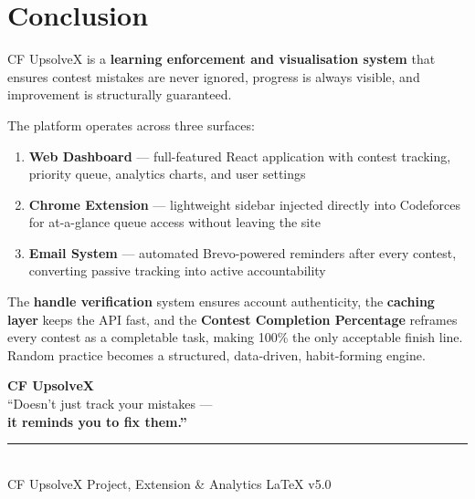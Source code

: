 \documentclass[11pt, a4paper]{article}
\begin{document}
\section{Conclusion}

\begin{infobox}
  CF UpsolveX is a \textbf{learning enforcement and visualisation system}
  that ensures contest mistakes are never ignored, progress is always visible,
  and improvement is structurally guaranteed.

  \vspace{0.5em}
  The platform operates across three surfaces:
  \begin{enumerate}
    \item \textbf{Web Dashboard} --- full-featured React application with contest
          tracking, priority queue, analytics charts, and user settings
    \item \textbf{Chrome Extension} --- lightweight sidebar injected directly
          into Codeforces for at-a-glance queue access without leaving the site
    \item \textbf{Email System} --- automated Brevo-powered reminders after every
          contest, converting passive tracking into active accountability
  \end{enumerate}

  \vspace{0.5em}
  The \textbf{handle verification} system ensures account authenticity,
  the \textbf{caching layer} keeps the API fast, and the
  \textbf{Contest Completion Percentage} reframes every contest as a
  completable task, making 100\% the only acceptable finish line.
  Random practice becomes a structured, data-driven, habit-forming engine.
\end{infobox}

\vspace{1em}
\begin{center}
  {\large\bfseries\color{accent} CF UpsolveX}\\[0.3em]
  {\color{textsecondary}``Doesn't just track your mistakes ---}\\
  {\color{textprimary}\bfseries it reminds you to fix them.''}
\end{center}

\vfill
\begin{center}
  \color{border}\rule{0.45\linewidth}{0.5pt}\\[5pt]
  {\footnotesize\ttfamily\color{textsecondary}
    CF UpsolveX \textbullet{} Project, Extension \& Analytics
    \textbullet{} \LaTeX{} v5.0}
\end{center}
\end{document}
